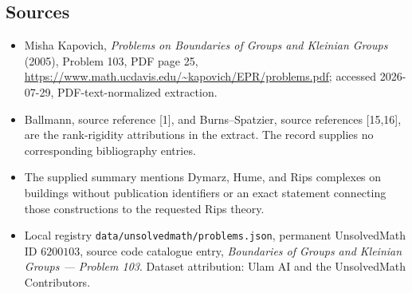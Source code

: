 \documentclass[11pt]{article}
\begin{document}
\subsection{Sources}
\begin{itemize}
\item Misha Kapovich, \emph{Problems on Boundaries of Groups and Kleinian Groups} (2005), Problem 103, PDF page 25, \url{https://www.math.ucdavis.edu/~kapovich/EPR/problems.pdf}; accessed 2026-07-29, PDF-text-normalized extraction.
\item Ballmann, source reference [1], and Burns--Spatzier, source references [15,16], are the rank-rigidity attributions in the extract. The record supplies no corresponding bibliography entries.
\item The supplied summary mentions Dymarz, Hume, and Rips complexes on buildings without publication identifiers or an exact statement connecting those constructions to the requested Rips theory.
\item Local registry \texttt{data/unsolvedmath/problems.json}, permanent UnsolvedMath ID $6200103$, source code catalogue entry, \emph{Boundaries of Groups and Kleinian Groups --- Problem 103}. Dataset attribution: Ulam AI and the UnsolvedMath Contributors.
\end{itemize}
\end{document}
